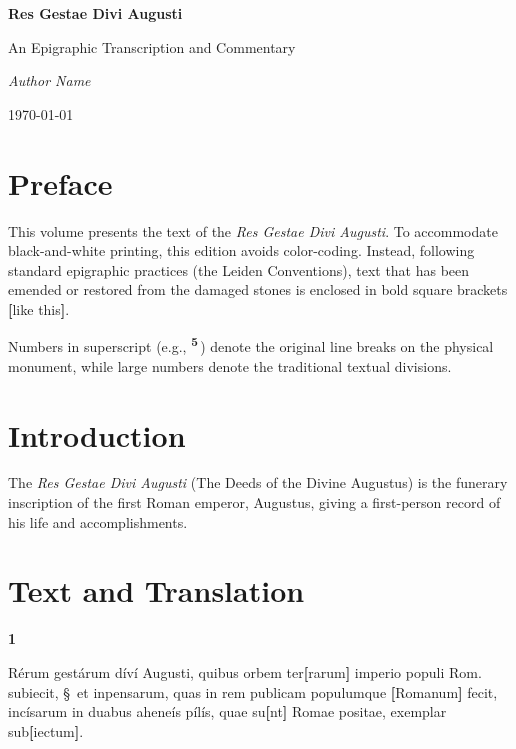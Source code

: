 \documentclass[11pt, twoside, a4paper]{book}
\newcommand{\linenum}[1]{\textsuperscript{\textbf{#1}}\,}
\newcommand{\rgchapter}[1]{%
    \par\vspace{1.5em}\noindent
    {\Huge\bfseries #1}\quad\ignorespaces
}
\newcommand{\emend}[1]{\textbf{[}#1\textbf{]}}
\newcommand{\sect}{\S\ }
\begin{document}
\frontmatter

\begin{titlepage}
    \centering
    \vspace*{4cm}
    {\Huge \textbf{Res Gestae Divi Augusti}\par}
    \vspace{1.5cm}
    {\Large An Epigraphic Transcription and Commentary\par}
    \vspace{4cm}
    {\Large \textit{Author Name}\par}
    \vfill
    {\large \today\par}
\end{titlepage}

\tableofcontents

\chapter{Preface}
This volume presents the text of the \textit{Res Gestae Divi Augusti}. 
To accommodate black-and-white printing, this edition avoids color-coding. 
Instead, following standard epigraphic practices (the Leiden Conventions), 
text that has been emended or restored from the damaged stones is enclosed 
in bold square brackets \emend{like this}.

Numbers in superscript (e.g., \linenum{5}) denote the original line breaks on the physical monument, while large numbers denote the traditional textual divisions.

\chapter{Introduction}
The \textit{Res Gestae Divi Augusti} (The Deeds of the Divine Augustus) is the funerary inscription of the first Roman emperor, Augustus, giving a first-person record of his life and accomplishments.

\mainmatter

\chapter{Text and Translation}


\rgchapter{1} 
Rérum gestárum díví Augusti, quibus orbem ter\emend{rarum} imperio populi Rom. subiecit, \sect et inpensarum, quas in rem publicam populumque \emend{Romanum} fecit, incísarum in duabus aheneís pílís, quae su\emend{nt} Romae positae, exemplar sub\emend{iectum}.
\end{document}
